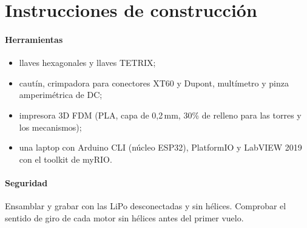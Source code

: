\section{Instrucciones de construcción}
\label{sec:build}

\paragraph{Herramientas}
\begin{itemize}
  \item llaves hexagonales y llaves TETRIX;
  \item cautín, crimpadora para conectores XT60 y Dupont, multímetro y pinza amperimétrica de DC;
  \item impresora 3D FDM (PLA, capa de 0,2\,mm, 30\% de relleno para las torres y los mecanismos);
  \item una laptop con Arduino CLI (núcleo ESP32), PlatformIO y LabVIEW 2019 con el toolkit de myRIO.
\end{itemize}

\paragraph{Seguridad}
Ensamblar y grabar con las LiPo desconectadas y sin hélices. Comprobar el sentido de giro de cada motor sin hélices antes del primer vuelo.


